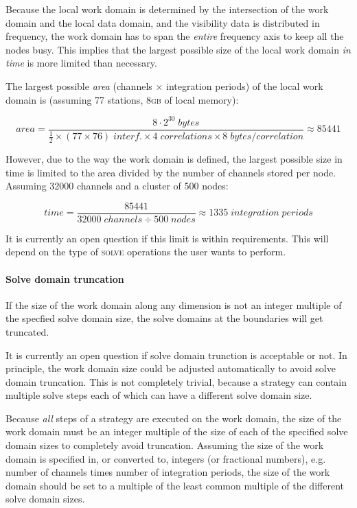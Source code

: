 \documentclass[10pt]{lofar}
\newcommand{\solve}{\textsc{solve}\xspace}
\begin{document}
Because the local work domain is determined by the intersection of the work
domain and the local data domain, and the visibility data is distributed in
frequency, the work domain has to span the \emph{entire} frequency axis to keep
all the nodes busy. This implies that the largest possible size of the local
work domain \emph{in time} is more limited than necessary.

The largest possible \emph{area} (channels $\times$ integration periods) of the
local work domain is (assuming 77 stations, 8\textsc{gb} of local memory):

\[
area=\frac{8\cdot2^{30}\;bytes}{\frac{1}{2}\times(77 \times 76) \; interf.
\times 4 \; correlations \times 8 \; bytes/correlation} \approx 85441
\]

However, due to the way the work domain is defined, the largest possible size in
time is limited to the area divided by the number of channels stored per node.
Assuming 32000 channels and a cluster of 500 nodes:

\[
time=\frac{85441}{32000\;channels \div 500\;nodes} \approx 1335\;integration\;
periods
\]

It is currently an open question if this limit is within requirements. This will
depend on the type of \solve operations the user wants to perform.

\paragraph{Solve domain truncation}

If the size of the work domain along any dimension is not an integer multiple of
the specfied solve domain size, the solve domains at the boundaries will get
truncated. 

It is currently an open question if solve domain trunction is acceptable or not.
In principle, the work domain size could be adjusted automatically to avoid
solve domain truncation. This is not completely trivial, because a strategy can
contain multiple solve steps each of which can have a different solve domain
size.

Because \emph{all} steps of a strategy are executed on the work domain, the size
of the work domain must be an integer multiple of the size of each of the
specified solve domain sizes to completely avoid truncation. Assuming the
size of the work domain is specified in, or converted to, integers (or
fractional numbers), e.g. number of channels times number of integration
periods, the size of the work domain should be set to a multiple of the least
common multiple of the different solve domain sizes.
\end{document}
